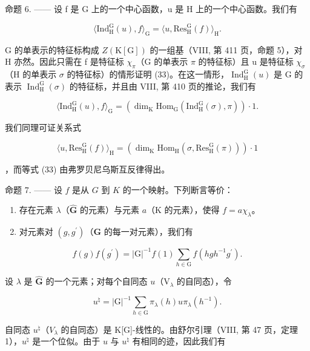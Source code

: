 命题 6. —— 设 f 是 G 上的一个中心函数，u 是 H 上的一个中心函数。我们有

\[
\langle \mathrm{Ind} _ {\mathrm{H}} ^ {\mathrm{G}} (u), f \rangle_ {\mathrm{G}} = \langle u, \mathrm{Res} _ {\mathrm{H}} ^ {\mathrm{G}} (f) \rangle_ {\mathrm{H}}.\tag{33}
\]

G 的单表示的特征标构成 \(Z(\mathrm{K}[\mathrm{G}])\) 的一组基（VIII, 第 411 页，命题 5），对 H 亦然。因此只需在 f 是特征标 \(\chi_{\pi}\)（G 的单表示 \(\pi\) 的特征标）且 u 是特征标 \(\chi_{\sigma}\)（H 的单表示 \(\sigma\) 的特征标）的情形证明 (33)。在这一情形，\(\operatorname{Ind}_{\mathrm{H}}^{\mathrm{G}}(u)\) 是 G 的表示 \(\operatorname{Ind}_{\mathrm{H}}^{\mathrm{G}}(\sigma)\) 的特征标，并且由 VIII, 第 410 页的推论，我们有

\[
\langle \mathrm{Ind} _ {\mathrm{H}} ^ {\mathrm{G}} (u), f \rangle_ {\mathrm{G}} = (\dim_ {\mathrm{K}} \mathrm{Hom} _ {\mathrm{G}} (\mathrm{Ind} _ {\mathrm{H}} ^ {\mathrm{G}} (\sigma), \pi)) \cdot 1.
\]

我们同理可证关系式

\[
\langle u, \mathrm{Res} _ {\mathrm{H}} ^ {\mathrm{G}} (f) \rangle_ {\mathrm{H}} = (\dim_ {\mathrm{K}} \mathrm{Hom} _ {\mathrm{H}} (\sigma , \mathrm{Res} _ {\mathrm{H}} ^ {\mathrm{G}} (\pi))) \cdot 1
\]

，而等式 (33) 由弗罗贝尼乌斯互反律得出。

命题 7. —— 设 \(f\) 是从 \(G\) 到 \(K\) 的一个映射。下列断言等价：

\begin{enumerate}
\def\labelenumi{(\roman{enumi})}
\item
  存在元素 \(\lambda\)（\(\widehat{\mathbf{G}}\) 的元素）与元素 \(a\)（\(\mathrm{K}\) 的元素），使得 \(f = a\chi_{\lambda}\)。
\item
  对元素对 \((g,g^{\prime})\)（\(\mathbf{G}\) 的每一对元素），我们有
\end{enumerate}

\[
f (g) f (g ^ {\prime}) = | \mathrm{G} | ^ {- 1} f (1) \sum_ {h \in \mathrm{G}} f (h g h ^ {- 1} g ^ {\prime}).\tag{34}
\]

设 \(\lambda\) 是 \(\widehat{\mathbf{G}}\) 的一个元素；对每个自同态 \(u\)（\(\mathrm{V}_{\lambda}\) 的自同态），令

\[
u ^ {\natural} = | \mathrm{G} | ^ {- 1} \sum_ {h \in \mathrm{G}} \pi_ {\lambda} (h) u \pi_ {\lambda} (h ^ {- 1}).\tag{35}
\]

自同态 \(u^{\natural}\)（\(V_{\lambda}\) 的自同态）是 K{[}G{]}-线性的。由舒尔引理（VIII, 第 47 页，定理 1），\(u^{\natural}\) 是一个位似。由于 \(u\) 与 \(u^{\natural}\) 有相同的迹，因此我们有

